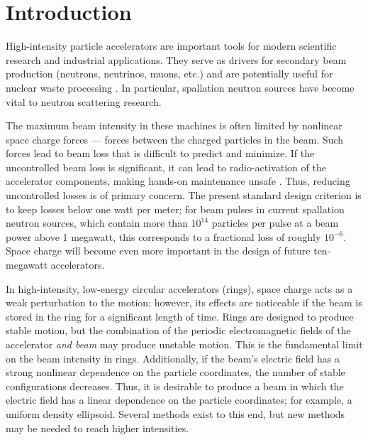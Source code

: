 \chapter{Introduction}\label{chap-1}

High-intensity particle accelerators are important tools for modern scientific research and industrial applications. They serve as drivers for secondary beam production (neutrons, neutrinos, muons, etc.) and are potentially useful for nuclear waste processing \cite{Yee-Rendon2021}. In particular, spallation neutron sources have become vital to neutron scattering research.

The maximum beam intensity in these machines is often limited by nonlinear space charge forces — forces between the charged particles in the beam. Such forces lead to beam loss that is difficult to predict and minimize. If the uncontrolled beam loss is significant, it can lead to radio-activation of the accelerator components, making hands-on maintenance unsafe \cite{Bungau2014}. Thus, reducing uncontrolled losses is of primary concern. The present standard design criterion is to keep losses below one watt per meter; for beam pulses in current spallation neutron sources, which contain more than $10^{14}$ particles per pulse at a beam power above 1 megawatt, this corresponds to a fractional loss of roughly $10^{-6}$. Space charge will become even more important in the design of future ten-megawatt accelerators. 
 
In high-intensity, low-energy circular accelerators (rings), space charge acts as a weak perturbation to the motion; however, its effects are noticeable if the beam is stored in the ring for a significant length of time. Rings are designed to produce stable motion, but the combination of the periodic electromagnetic fields of the accelerator \textit{and beam} may produce unstable motion. This is the fundamental limit on the beam intensity in rings. Additionally, if the beam's electric field has a strong nonlinear dependence on the particle coordinates, the number of stable configurations decreases. Thus, it is desirable to produce a beam in which the electric field has a linear dependence on the particle coordinates; for example, a uniform density ellipsoid. Several methods exist to this end, but new methods may be needed to reach higher intensities.
 
